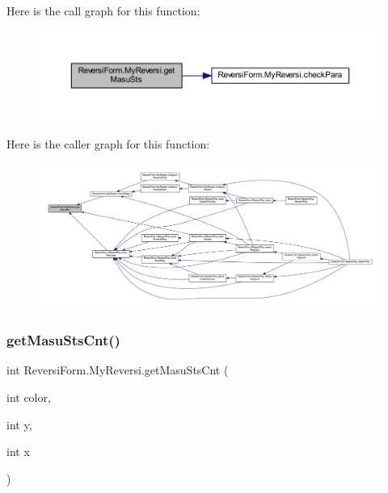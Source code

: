Here is the call graph for this function\+:
\nopagebreak
\begin{figure}[H]
\begin{center}
\leavevmode
\includegraphics[width=350pt]{class_reversi_form_1_1_my_reversi_ab6498c154199b58c418af1e0058736f6_cgraph}
\end{center}
\end{figure}
Here is the caller graph for this function\+:
\nopagebreak
\begin{figure}[H]
\begin{center}
\leavevmode
\includegraphics[width=350pt]{class_reversi_form_1_1_my_reversi_ab6498c154199b58c418af1e0058736f6_icgraph}
\end{center}
\end{figure}
\mbox{\label{class_reversi_form_1_1_my_reversi_a26818336f7915237cf274e1fdff7ec4b}} 
\subsubsection{\texorpdfstring{get\+Masu\+Sts\+Cnt()}{getMasuStsCnt()}}
{\footnotesize\ttfamily int Reversi\+Form.\+My\+Reversi.\+get\+Masu\+Sts\+Cnt (\begin{DoxyParamCaption}\item[{int}]{color,  }\item[{int}]{y,  }\item[{int}]{x }\end{DoxyParamCaption})}



